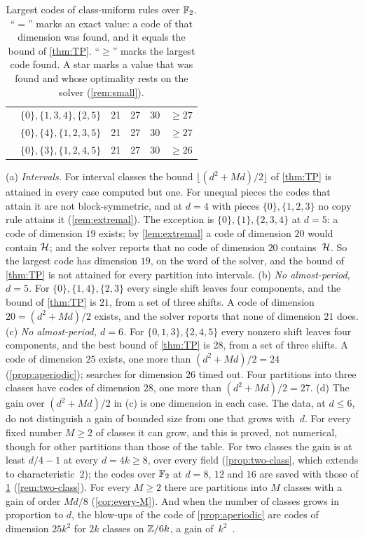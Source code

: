 \begin{table}[ht]
\begin{tabular}{@{}cllccl@{}}
  & $\{0\},\{1,3,4\},\{2,5\}$ & 21 & 27 & 30 & $\ge27$ \\
  & $\{0\},\{4\},\{1,2,3,5\}$ & 21 & 27 & 30 & $\ge27$ \\
  & $\{0\},\{3\},\{1,2,4,5\}$ & 21 & 27 & 30 & $\ge26$ \\
\bottomrule
\end{tabular}
\caption{Largest codes of class-uniform rules over $\mathbb{F}_2$. ``$=$'' marks an exact value: a code of that dimension
was found, and it equals the bound of \cref{thm:TP}. ``$\ge$'' marks the largest code found. A star marks a value that
was found and whose optimality rests on the solver (\cref{rem:small}).}\label{tab:small}
\end{table}

\begin{remark}\label{rem:small}
(a) \emph{Intervals.} For interval classes the bound $\lfloor(d^2+Md)/2\rfloor$ of \cref{thm:TP} is attained in every
case computed but one. For unequal pieces the codes that attain it are not block-symmetric, and at $d=4$ with pieces
$\{0\},\{1,2,3\}$ no copy rule attains it (\cref{rem:extremal}). The exception is $\{0\},\{1\},\{2,3,4\}$ at $d=5$: a
code of dimension $19$ exists; by \cref{lem:extremal} a code of dimension $20$ would contain $\mathcal{H}$; and the solver
reports that no code of dimension $20$ contains~$\mathcal{H}$. So the largest code has dimension $19$, on the word of the
solver, and the bound of \cref{thm:TP} is not attained for every partition into intervals.
(b) \emph{No almost-period, $d=5$.} For $\{0\},\{1,4\},\{2,3\}$ every single shift leaves four components, and the
bound of \cref{thm:TP} is $21$, from a set of three shifts. A code of dimension $20=(d^2+Md)/2$ exists, and the solver reports that
none of dimension $21$ does.
(c) \emph{No almost-period, $d=6$.} For $\{0,1,3\},\{2,4,5\}$ every nonzero shift leaves four components, and the best
bound of \cref{thm:TP} is $28$, from a set of three shifts. A code of dimension $25$ exists, one more than
$(d^2+Md)/2=24$
(\cref{prop:aperiodic}); searches for dimension $26$ timed out. Four partitions into three classes have codes of
dimension $28$, one more than $(d^2+Md)/2=27$.
(d) The gain over $(d^2+Md)/2$ in (c) is one dimension in each case. The data, at $d\le6$, do not distinguish a gain
of bounded size from one that grows with~$d$. For every fixed number $M\ge2$ of classes it can grow, and this is proved, not
numerical, though for other partitions than those of the table. For two classes the gain is at least $d/4-1$ at every
$d=4k\ge8$, over every field (\cref{prop:two-class}, which extends \cite[Theorem~4.8]{ClassUniformMemo2026} to
characteristic~$2$); the codes over $\mathbb{F}_2$ at $d=8$, $12$ and $16$ are saved with those of \cref{tab:small}
(\cref{rem:two-class}). For every $M\ge2$ there are partitions into $M$ classes with a gain of order $Md/8$
(\cref{cor:every-M}). And when the number of classes grows in proportion to $d$, the blow-ups of the code of
\cref{prop:aperiodic} are codes of dimension $25k^2$ for $2k$ classes on $\mathbb{Z}/6k$, a gain
of~$k^2$~\cite[Theorem~4.2 and Corollary~4.4]{ClassUniformMemo2026}.
\end{remark}

